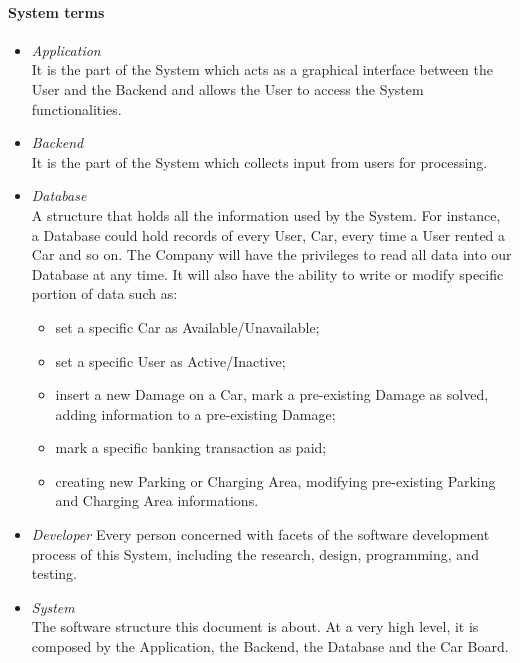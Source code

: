 \paragraph{System terms}
\begin{itemize}
	\item \emph{Application} \\
	It is the part of the System which acts as a graphical interface between the User and the Backend and allows the User to access the System functionalities.

	\item \emph{Backend}\\
	It is the part of the System which collects input from users for processing.
	
	
	\item \emph{Database} \label{var:database}\\
	A structure that holds all the information used by the System. For instance, a Database could hold records of every User, Car, every time a User rented a Car and so on. 
	The Company will have the privileges to read all data into our Database at any time. It will also have the ability to write or modify specific portion of data such as:
	\begin{itemize}
		\item set a specific Car as Available/Unavailable;
		\item set a specific User as Active/Inactive;
		\item insert a new Damage on a Car, mark a pre-existing Damage as solved, adding information to a pre-existing Damage;
		\item mark a specific banking transaction as paid;
		\item creating new Parking or Charging Area, modifying pre-existing Parking and Charging Area informations.
	\end{itemize}
	
	\item \emph{Developer}
	Every person concerned with facets of the software development process of this System, including the research, design, programming, and testing. 
	
	\item \emph{System}\\
	The software structure this document is about. At a very high level, it is composed by the Application, the Backend, the Database and the Car Board.
\end{itemize}

